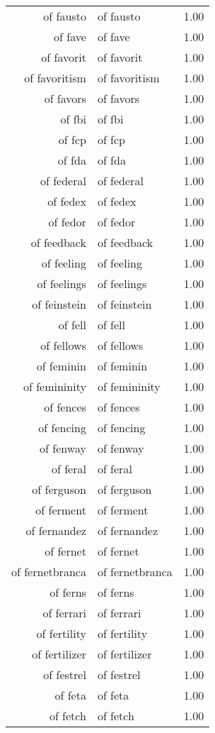 \begin{table}[ht]
\begin{tabular}{rlr}
  of fausto & of fausto & 1.00 \\ 
  of fave & of fave & 1.00 \\ 
  of favorit & of favorit & 1.00 \\ 
  of favoritism & of favoritism & 1.00 \\ 
  of favors & of favors & 1.00 \\ 
  of fbi & of fbi & 1.00 \\ 
  of fcp & of fcp & 1.00 \\ 
  of fda & of fda & 1.00 \\ 
  of federal & of federal & 1.00 \\ 
  of fedex & of fedex & 1.00 \\ 
  of fedor & of fedor & 1.00 \\ 
  of feedback & of feedback & 1.00 \\ 
  of feeling & of feeling & 1.00 \\ 
  of feelings & of feelings & 1.00 \\ 
  of feinstein & of feinstein & 1.00 \\ 
  of fell & of fell & 1.00 \\ 
  of fellows & of fellows & 1.00 \\ 
  of feminin & of feminin & 1.00 \\ 
  of femininity & of femininity & 1.00 \\ 
  of fences & of fences & 1.00 \\ 
  of fencing & of fencing & 1.00 \\ 
  of fenway & of fenway & 1.00 \\ 
  of feral & of feral & 1.00 \\ 
  of ferguson & of ferguson & 1.00 \\ 
  of ferment & of ferment & 1.00 \\ 
  of fernandez & of fernandez & 1.00 \\ 
  of fernet & of fernet & 1.00 \\ 
  of fernetbranca & of fernetbranca & 1.00 \\ 
  of ferns & of ferns & 1.00 \\ 
  of ferrari & of ferrari & 1.00 \\ 
  of fertility & of fertility & 1.00 \\ 
  of fertilizer & of fertilizer & 1.00 \\ 
  of festrel & of festrel & 1.00 \\ 
  of feta & of feta & 1.00 \\ 
  of fetch & of fetch & 1.00 \\ 

\end{tabular}
\end{table}
